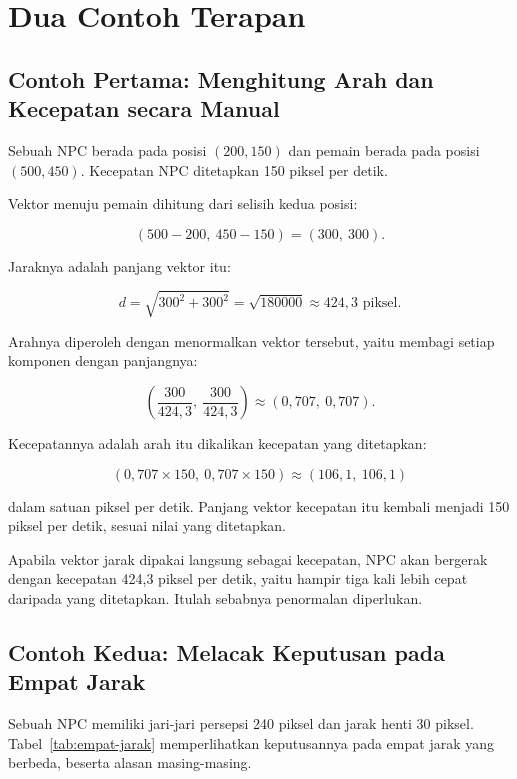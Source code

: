 \section{Dua Contoh Terapan}
\label{sec:contoh-bab-8}

\subsection{Contoh Pertama: Menghitung Arah dan Kecepatan secara Manual}

\begin{contohbox}
Sebuah NPC berada pada posisi $(200, 150)$ dan pemain berada pada posisi
$(500, 450)$. Kecepatan NPC ditetapkan 150 piksel per detik.

Vektor menuju pemain dihitung dari selisih kedua posisi:

\[
(500 - 200,\ 450 - 150) = (300,\ 300).
\]

Jaraknya adalah panjang vektor itu:

\[
d = \sqrt{300^2 + 300^2} = \sqrt{180000} \approx 424{,}3 \text{ piksel}.
\]

Arahnya diperoleh dengan menormalkan vektor tersebut, yaitu membagi setiap
komponen dengan panjangnya:

\[
\left(\frac{300}{424{,}3},\ \frac{300}{424{,}3}\right) \approx (0{,}707,\ 0{,}707).
\]

Kecepatannya adalah arah itu dikalikan kecepatan yang ditetapkan:

\[
(0{,}707 \times 150,\ 0{,}707 \times 150) \approx (106{,}1,\ 106{,}1)
\]

dalam satuan piksel per detik. Panjang vektor kecepatan itu kembali menjadi
150 piksel per detik, sesuai nilai yang ditetapkan.
\end{contohbox}

Apabila vektor jarak dipakai langsung sebagai kecepatan, NPC akan bergerak
dengan kecepatan 424,3 piksel per detik, yaitu hampir tiga kali lebih cepat
daripada yang ditetapkan. Itulah sebabnya penormalan diperlukan.

\subsection{Contoh Kedua: Melacak Keputusan pada Empat Jarak}

\begin{contohbox}
Sebuah NPC memiliki jari-jari persepsi 240 piksel dan jarak henti 30 piksel.
Tabel~\ref{tab:empat-jarak} memperlihatkan keputusannya pada empat jarak yang
berbeda, beserta alasan masing-masing.
\end{contohbox}

